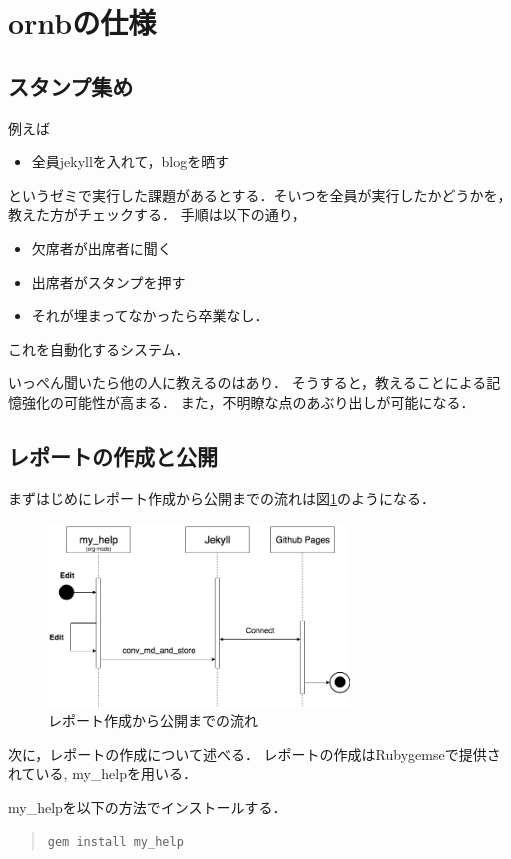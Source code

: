 \documentclass{jsarticle}
\begin{document}
\section{ornbの仕様}
\label{sec:org3d99273}
\subsection{スタンプ集め}
\label{sec:org0d33fba}
例えば
\begin{itemize}
\item 全員jekyllを入れて，blogを晒す
\end{itemize}
というゼミで実行した課題があるとする．そいつを全員が実行したかどうかを，教えた方がチェックする．
手順は以下の通り，
\begin{itemize}
\item 欠席者が出席者に聞く
\item 出席者がスタンプを押す
\item それが埋まってなかったら卒業なし．
\end{itemize}
これを自動化するシステム．

いっぺん聞いたら他の人に教えるのはあり．
そうすると，教えることによる記憶強化の可能性が高まる．
また，不明瞭な点のあぶり出しが可能になる．

\subsection{レポートの作成と公開}
\label{sec:orgfcdf537}
まずはじめにレポート作成から公開までの流れは図\ref{fig:org3f74bcd}のようになる．
\begin{figure}[htbp]
\centering
\includegraphics[width=8cm]{./images/myhelp_to_jekyll.png}
\caption{\label{fig:org3f74bcd}
レポート作成から公開までの流れ}
\end{figure}


次に，レポートの作成について述べる．
レポートの作成はRubygemseで提供されている,
my\_helpを用いる．

my\_helpを以下の方法でインストールする．
\begin{quote}
\begin{verbatim}
gem install my_help
\end{verbatim}
\end{quote}
\end{document}
